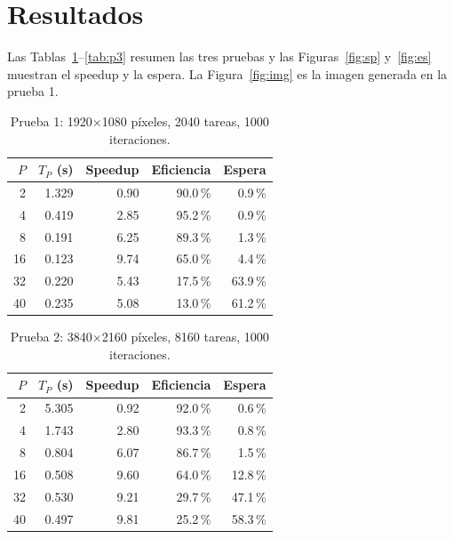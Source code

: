 \documentclass[runningheads]{llncs}
\begin{document}
\section{Resultados}
Las Tablas~\ref{tab:p1}--\ref{tab:p3} resumen las tres pruebas y las Figuras~\ref{fig:sp} y~\ref{fig:es} muestran el speedup y la
espera. La Figura~\ref{fig:img} es la imagen generada en la prueba 1.

\begin{table}[t]
\caption{Prueba 1: 1920$\times$1080 p\'ixeles, 2040 tareas, 1000 iteraciones.}\label{tab:p1}
\centering\footnotesize
\begin{tabular}{|r|r|r|r|r|}\hline
$P$ & $T_P$ (s) & Speedup & Eficiencia & Espera \\ \hline
2 & 1.329 & 0.90 & 90.0\,\% & 0.9\,\% \\ \hline
4 & 0.419 & 2.85 & 95.2\,\% & 0.9\,\% \\ \hline
8 & 0.191 & 6.25 & 89.3\,\% & 1.3\,\% \\ \hline
16 & 0.123 & 9.74 & 65.0\,\% & 4.4\,\% \\ \hline
32 & 0.220 & 5.43 & 17.5\,\% & 63.9\,\% \\ \hline
40 & 0.235 & 5.08 & 13.0\,\% & 61.2\,\% \\ \hline
\end{tabular}
\end{table}

\begin{table}[t]
\caption{Prueba 2: 3840$\times$2160 p\'ixeles, 8160 tareas, 1000 iteraciones.}\label{tab:p2}
\centering\footnotesize
\begin{tabular}{|r|r|r|r|r|}\hline
$P$ & $T_P$ (s) & Speedup & Eficiencia & Espera \\ \hline
2 & 5.305 & 0.92 & 92.0\,\% & 0.6\,\% \\ \hline
4 & 1.743 & 2.80 & 93.3\,\% & 0.8\,\% \\ \hline
8 & 0.804 & 6.07 & 86.7\,\% & 1.5\,\% \\ \hline
16 & 0.508 & 9.60 & 64.0\,\% & 12.8\,\% \\ \hline
32 & 0.530 & 9.21 & 29.7\,\% & 47.1\,\% \\ \hline
40 & 0.497 & 9.81 & 25.2\,\% & 58.3\,\% \\ \hline
\end{tabular}
\end{table}
\end{document}
